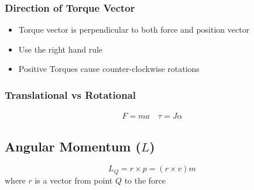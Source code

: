 \documentclass[../Notes.tex]{subfiles}
\begin{document}
    \subsubsection{Direction of Torque Vector}
    \begin{itemize}
        \item Torque vector is perpendicular to both force and position vector
        \item Use the right hand rule
        \item Positive Torques cause counter-clockwise rotations 
    \end{itemize}
    \subsubsection{Translational vs Rotational}
    \begin{align*}
        F = m a \quad
        \tau = J \alpha
    \end{align*}

    \subsection{Angular Momentum ($L$)}
    \begin{equation*}
        L_Q = r \times p = (r \times v)m
    \end{equation*}
    where $r$ is a vector from point $Q$ to the force
\end{document}
